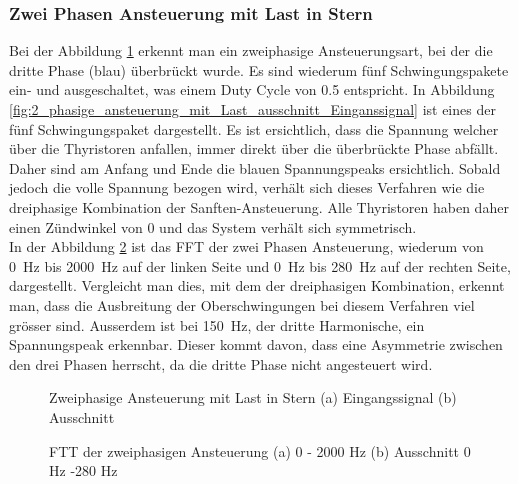 \subsubsection*{Zwei Phasen Ansteuerung mit Last in Stern}\label{sec:2_phasen_Ansteuerung}
Bei der Abbildung \ref{fig:2_phasige_ansteuerung_mit_Last} erkennt man ein zweiphasige Ansteuerungsart, bei der die dritte Phase (blau) überbrückt wurde. Es sind wiederum fünf Schwingungspakete ein- und ausgeschaltet, was einem Duty Cycle von 0.5 entspricht. In Abbildung \ref{fig:2_phasige_ansteuerung_mit_Last_ausschnitt_Einganssignal} ist eines der fünf Schwingungspaket dargestellt. Es ist ersichtlich, dass die Spannung welcher über die Thyristoren anfallen, immer direkt über die überbrückte Phase abfällt. Daher sind am Anfang und Ende die blauen Spannungspeaks ersichtlich. Sobald jedoch die volle Spannung bezogen wird, verhält sich dieses Verfahren wie die dreiphasige Kombination der Sanften-Ansteuerung. Alle Thyristoren haben daher einen Zündwinkel von 0\textdegree\hspace{0.02cm} und das System verhält sich symmetrisch.\\
In der Abbildung \ref{fig:2_phasige_ansteuerung_mit_Last_FFT} ist das FFT der zwei Phasen Ansteuerung, wiederum von \SI{0}{Hz} bis \SI{2000}{Hz} auf der linken Seite und \SI{0}{Hz} bis \SI{280}{Hz} auf der rechten Seite, dargestellt. Vergleicht man dies, mit dem der dreiphasigen Kombination, erkennt man, dass die Ausbreitung der Oberschwingungen bei diesem Verfahren viel grösser sind. Ausserdem ist bei \SI{150}{Hz}, der dritte Harmonische, ein Spannungspeak erkennbar. Dieser kommt davon, dass eine Asymmetrie zwischen den drei Phasen herrscht, da die dritte Phase nicht angesteuert wird.

\begin{figure}[ht!]
	\centering
	\qquad
	\caption{Zweiphasige Ansteuerung mit Last in Stern (a) Eingangssignal (b) Ausschnitt}
	\label{fig:2_phasige_ansteuerung_mit_Last}
\end{figure}


\begin{figure}[ht!]
	\centering
	\qquad
	\caption{FTT der zweiphasigen Ansteuerung  (a) 0 - 2000 Hz (b) Ausschnitt 0 Hz -280 Hz}
	\label{fig:2_phasige_ansteuerung_mit_Last_FFT}
\end{figure}




